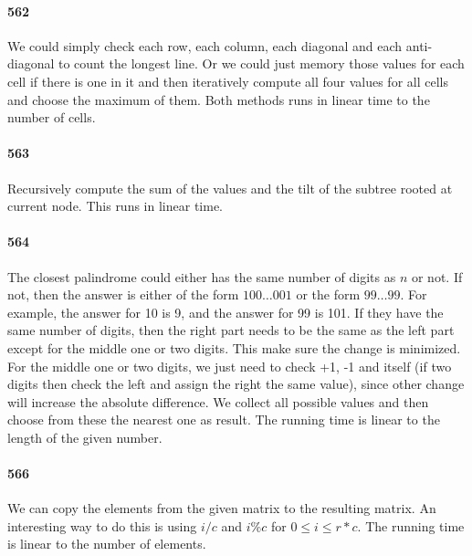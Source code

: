 \documentclass[11pt]{article}
\begin{document}
\paragraph{562}
We could simply check each row, each column, each diagonal and each anti-diagonal to count the longest line. Or we could just
memory those values for each cell if there is one in it and then iteratively compute all four values for all cells and choose
the maximum of them. Both methods runs in linear time to the number of cells.

\paragraph{563}
Recursively compute the sum of the values and the tilt of the subtree rooted at current node. This runs in linear time.

\paragraph{564}
The closest palindrome could either has the same number of digits as $n$ or not. If not, then the answer is either of the form
$100 \dots 001$ or the form $99\dots99$. For example, the answer for 10 is 9, and the answer for 99 is 101. 
If they have the same number of digits, then the right part needs to be the same as the left part except for the middle one
or two digits. This make sure the change is minimized. For the middle one or two digits, we just need to check +1, -1 and
itself (if two digits then check the left and assign the right the same value), since other change will increase the absolute 
difference. We collect all possible values and then choose from these the nearest one as result. 
The running time is linear to the length of the given number.


\paragraph{566}
We can copy the elements from the given matrix to the resulting matrix. An interesting way to do this is using $i/c$ and $i \%
c$ for $0 \le i \le r * c$. The running time is linear to the number of elements.
\end{document}
